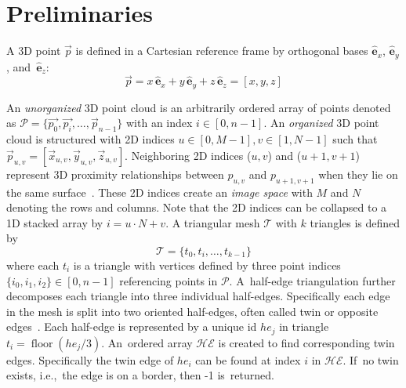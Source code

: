 
\section{Preliminaries}\label{sec:ch3_prelim}

A 3D point $ \vec{{p}}$ is defined in a Cartesian reference frame by orthogonal bases $\hat{\mathbf{e}}_x$,  $\hat{\mathbf{e}}_y$,  and~$\hat{\mathbf{e}}_z$:
\begin{equation}
\label{eq:ch3_point}
    \vec{{p}}=x\,\hat{\mathbf{e}}_x + y\, \hat{\mathbf{e}}_y + z\, \hat{\mathbf{e}}_z= [x,y,z]
\end{equation}

An \emph{unorganized} 3D point cloud is an arbitrarily ordered array of points denoted as $\mathcal{P}=\{ \vec{{p}_{0}}, \vec{{p}_{i}}, \ldots, \vec{{p}}_{n-1} \}$ with an index $i \in [0, n-1]$.
An \emph{organized} 3D point cloud is structured with 2D indices $u \in [0, M -1], v \in [1, N -1]$ such that $\vec{p}_{u,v} = [\vec{x}_{u,v}, \vec{y}_{u,v}, \vec{z}_{u,v}]$.   Neighboring 2D indices ($u,v$) and ($u+1, v+1$) represent 3D proximity relationships between $p_{u,v}$ and $p_{u+1,v+1}$ when they lie on the same surface~\cite{feng_fast_2014}. These 2D indices create an \emph{image space} with $M$ and $N$ denoting the rows and columns. 
Note that the 2D indices can be collapsed to a 1D stacked array by $i = u \cdot N + v$. %
 A triangular mesh $ \mathcal{T}$ with $k$ triangles is defined by
\begin{equation}
\label{eq:ch3_tri}
    \mathcal{T} = \{ t_0, t_i, \ldots, t_{k-1} \}
\end{equation}
where each $t_i$ is a triangle with vertices defined by three point indices $\{i_0, i_1, i_2\} \in \left[0,n-1\right]$ referencing points in $\mathcal{P}$. A~half-edge triangulation further decomposes each triangle into three individual half-edges. Specifically each edge in the mesh is split into two oriented half-edges, often called twin or opposite edges~\cite{paris_modified_2013}. Each half-edge is represented by a unique id $he_j$ in triangle $t_i = \operatorname{floor}(he_j/3)$. An~ordered array $\mathcal{HE}$ is created to find corresponding twin edges. Specifically the twin edge of $he_i$ can be found at index $i$ in $\mathcal{HE}$. If~no twin exists, i.e.,~the edge is on a border, then -1 is~returned.

